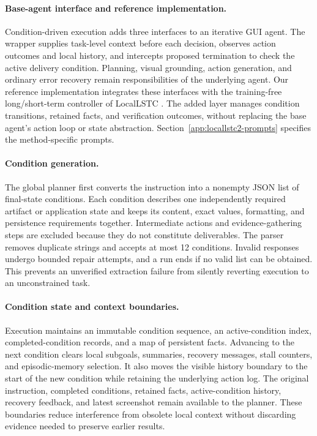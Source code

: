 \documentclass[11pt]{article}
\begin{document}
\paragraph{Base-agent interface and reference implementation.}
Condition-driven execution adds three interfaces to an iterative GUI agent. The wrapper supplies task-level context before each decision, observes action outcomes and local history, and intercepts proposed termination to check the active delivery condition. Planning, visual grounding, action generation, and ordinary error recovery remain responsibilities of the underlying agent. Our reference implementation integrates these interfaces with the training-free long/short-term controller of LocalLSTC \citep{locallstc}. The added layer manages condition transitions, retained facts, and verification outcomes, without replacing the base agent's action loop or state abstraction. Section~\ref{app:locallstc2-prompts} specifies the method-specific prompts.

\paragraph{Condition generation.}
The global planner first converts the instruction into a nonempty JSON list of final-state conditions. Each condition describes one independently required artifact or application state and keeps its content, exact values, formatting, and persistence requirements together. Intermediate actions and evidence-gathering steps are excluded because they do not constitute deliverables. The parser removes duplicate strings and accepts at most 12 conditions. Invalid responses undergo bounded repair attempts, and a run ends if no valid list can be obtained. This prevents an unverified extraction failure from silently reverting execution to an unconstrained task.

\paragraph{Condition state and context boundaries.}
Execution maintains an immutable condition sequence, an active-condition index, completed-condition records, and a map of persistent facts. Advancing to the next condition clears local subgoals, summaries, recovery messages, stall counters, and episodic-memory selection. It also moves the visible history boundary to the start of the new condition while retaining the underlying action log. The original instruction, completed conditions, retained facts, active-condition history, recovery feedback, and latest screenshot remain available to the planner. These boundaries reduce interference from obsolete local context without discarding evidence needed to preserve earlier results.
\end{document}

